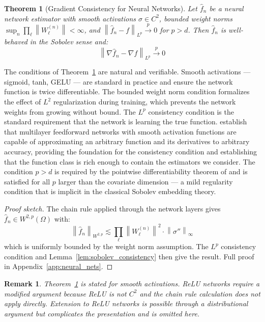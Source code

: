 \documentclass[12pt]{article}
\newtheorem{theorem}{Theorem}
\newtheorem{remark}{Remark}
\newcommand{\norm}[1]{\left\| #1 \right\|}
\newcommand{\Wtwop}{W^{2,p}(\Omega)}
\newcommand{\fn}{\hat{f}_n}
\newcommand{\xrightarrowp}{\xrightarrow{p}}
\begin{document}
	\begin{theorem}[Gradient Consistency for Neural Networks]
		\label{thm:neural_nets}
		Let $\fn$ be a neural network estimator with smooth activations $\sigma \in C^2$,
		bounded weight norms $\sup_n \prod_\ell \norm{W_\ell^{(n)}} < \infty$, and
		$\norm{\fn - f}_{L^p} \xrightarrowp 0$ for $p > d$. Then $\fn$ is well-behaved in
		the Sobolev sense and:
		\begin{equation}
			\norm{\nabla \fn - \nabla f}_{L^p} \xrightarrowp 0
		\end{equation}
	\end{theorem}
	
	The conditions of Theorem~\ref{thm:neural_nets} are natural and verifiable. Smooth
	activations --- sigmoid, tanh, GELU --- are standard in practice and ensure the network
	function is twice differentiable. The bounded weight norm condition formalizes the
	effect of $L^2$ regularization during training, which prevents the network weights from
	growing without bound. The $L^p$ consistency condition is the standard requirement that
	the network is learning the true function. \citet{hornik1990universal} establish that
	multilayer feedforward networks with smooth activation functions are capable of
	approximating an arbitrary function and its derivatives to arbitrary accuracy, providing
	the foundation for the consistency condition and establishing that the function class is
	rich enough to contain the estimators we consider. The condition $p > d$ is required by
	the pointwise differentiability theorem of \citet[Theorem~6.5]{evans2015measure} and
	is satisfied for all $p$ larger than the covariate dimension --- a mild regularity
	condition that is implicit in the classical Sobolev embedding theory.
	
	\begin{proof}[Proof sketch]
		The chain rule applied through the network layers gives $\fn \in \Wtwop$ with:
		\begin{equation}
			\norm{\fn}_{W^{2,p}} \lesssim \prod_\ell \norm{W_\ell^{(n)}}^2 \cdot
			\norm{\sigma''}_\infty
		\end{equation}
		which is uniformly bounded by the weight norm assumption. The $L^p$ consistency
		condition and Lemma~\ref{lem:sobolev_consistency} then give the result. Full proof
		in Appendix~\ref{app:neural_nets}.
	\end{proof}
	
	\begin{remark}
		Theorem~\ref{thm:neural_nets} is stated for smooth activations. ReLU networks
		require a modified argument because ReLU is not $C^2$ and the chain rule calculation
		does not apply directly. Extension to ReLU networks is possible through a
		distributional argument but complicates the presentation and is omitted here.
	\end{remark}
	
\end{document}
